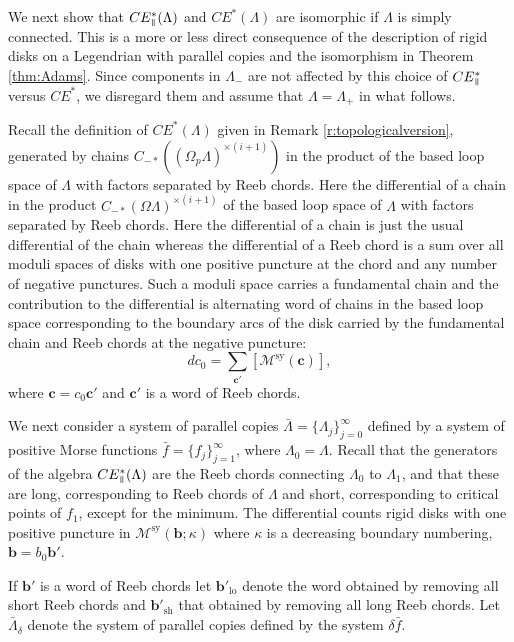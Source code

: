\documentclass{gtpart}
\newcommand{\sy}{\mathrm{sy}}
\renewcommand{\parallel}{{\mkern3mu\vphantom{\perp}\vrule depth 0pt\mkern2mu\vrule depth
0pt\mkern3mu}}
\begin{document}
We next show that $CE^{\ast}_{\parallel}(\Lambda)$ and $CE^{\ast}(\Lambda)$ are isomorphic if $\Lambda$ is simply connected.
This is a more or less direct consequence of the description of rigid disks on a Legendrian with parallel copies and the isomorphism in Theorem \ref{thm:Adams}. Since components in $\Lambda_{-}$ are not affected by this choice of $CE^{\ast}_{\parallel}$ versus $CE^{\ast}$, we disregard them and assume that $\Lambda=\Lambda_{+}$ in what follows.

Recall the definition of $CE^{\ast}(\Lambda)$ given in Remark \ref{r:topologicalversion}, generated by
chains $C_{-\ast}((\Omega_{p}\Lambda)^{\times (i+1)})$ in the product of the based loop space of $\Lambda$ with factors separated by Reeb chords. Here the differential of a chain in the product $C_{-\ast}(\Omega\Lambda)^{\times (i+1)}$ of the based loop space of $\Lambda$ with factors separated by Reeb chords. Here the differential of a chain
is just the usual differential of the chain whereas the differential of a Reeb chord is a sum over
all moduli spaces of disks with one positive puncture at the chord and any number of negative
punctures. Such a moduli space carries a fundamental chain and the contribution to the differential is alternating word of chains in the based loop space corresponding to the boundary arcs of the disk carried by the fundamental chain and Reeb chords at the negative puncture:
\[
d c_{0} = \sum_{\mathbf{c}'}[\mathcal{M}^{\sy}(\mathbf{c})],
\]  
where $\mathbf{c}=c_{0}\mathbf{c}'$ and $\mathbf{c}'$ is a word of Reeb chords.

We next consider a system of parallel copies $\bar\Lambda=\{\Lambda_{j}\}_{j=0}^{\infty}$ defined by a system of positive Morse functions $\bar f=\{f_{j}\}_{j=1}^{\infty}$, where $\Lambda_{0}=\Lambda$. Recall that the generators of the algebra $CE^{\ast}_{\parallel}(\Lambda)$ are the Reeb chords connecting $\Lambda_{0}$ to $\Lambda_{1}$, and that these are long, corresponding to Reeb chords of $\Lambda$ and short, corresponding to critical points of $f_{1}$, except for the minimum. The differential counts rigid disks with one positive puncture in $\mathcal{M}^{\sy}(\mathbf{b};\kappa)$ where $\kappa$ is a decreasing boundary numbering, $\mathbf{b}=b_{0}\mathbf{b}'$. 

If $\mathbf{b}'$ is a word of Reeb chords let $\mathbf{b}'_{\mathrm{lo}}$ denote the word obtained by removing all short Reeb chords and $\mathbf{b}'_{\mathrm{sh}}$ that obtained by removing all long Reeb chords. Let $\bar{\Lambda}_{\delta}$ denote the system of parallel copies defined by the system $\delta\bar f$.
\end{document}

